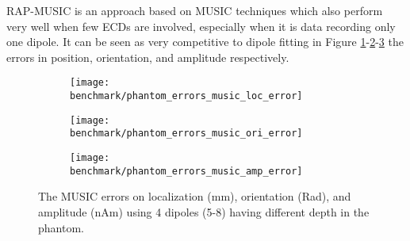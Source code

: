 RAP-MUSIC is an approach based on MUSIC techniques which also perform very well when few ECDs are involved, especially when it is data recording only one dipole. It can be seen as very competitive to dipole fitting in Figure \ref{fig:music_pos}-\ref{fig:music_ori}-\ref{fig:music_amp} the errors in position, orientation, and amplitude respectively.

\begin{sidewaysfigure}[ht]
        \centering
        \begin{subfigure}[b]{0.28\textwidth}
            \centering
            \texttt{[image: benchmark/phantom\_errors\_music\_loc\_error]}
            \caption{\label{fig:music_pos}}
        \end{subfigure}
		\hspace{35pt}
        \begin{subfigure}[b]{0.28\textwidth}  
            \centering 
            \texttt{[image: benchmark/phantom\_errors\_music\_ori\_error]}
            \caption{\label{fig:music_ori}}
        \end{subfigure}
		\hspace{35pt}
        \begin{subfigure}[b]{0.28\textwidth}   
            \centering 
            \texttt{[image: benchmark/phantom\_errors\_music\_amp\_error]}
            \caption{\label{fig:music_amp}}
        \end{subfigure}

		\caption{The MUSIC errors on localization (mm), orientation (Rad), and amplitude (nAm) using 4 dipoles (5-8) having different depth in the phantom.\label{fig:music_errors}}
\end{sidewaysfigure}


